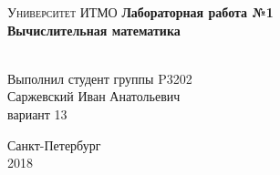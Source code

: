 \begin{titlepage}
\begin{center}

\textsc{Университет ИТМО}
\vfill
\textbf{Лабораторная работа №1\\[4mm]
Вычислительная математика}\\[16mm]
\begin{flushright}
~\\[2mm]Выполнил студент группы P3202
~\\[2mm]Саржевский Иван Анатольевич
~\\[2mm]вариант 13
\end{flushright}
\vfill
Санкт-Петербург\\[2mm]
2018

\end{center}
\end{titlepage}
